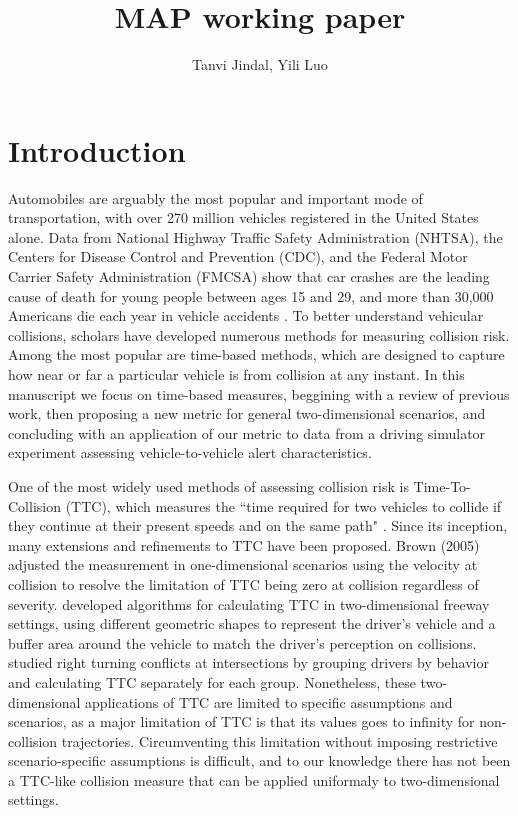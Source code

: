 \documentclass{article}
\title{MAP working paper}
\author{Tanvi Jindal, Yili Luo }
\date{}
\begin{document}
\maketitle

\section{Introduction}
Automobiles are arguably the most popular and important mode of transportation, with over 270 million vehicles registered in the United States alone.  Data from National Highway Traffic Safety Administration (NHTSA), the Centers for Disease Control and Prevention (CDC), and the Federal Motor Carrier Safety Administration (FMCSA) show that car crashes are the leading cause of death for young people between ages 15 and 29, and more than 30,000 Americans die each year in vehicle accidents \citep{Beltz2018}. To better understand vehicular collisions, scholars have developed numerous methods for measuring collision risk. Among the most popular are time-based methods, which are designed to capture how near or far a particular vehicle is from collision at any instant.  In this manuscript we focus on time-based measures, beggining with a review of previous work, then proposing a new metric for general two-dimensional scenarios, and concluding with an application of our metric to data from a driving simulator experiment assessing vehicle-to-vehicle alert characteristics. 

One of the most widely used methods of assessing collision risk is Time-To-Collision (TTC), which measures the ``time required for two vehicles to collide if they continue at their present speeds and on the same path" \citep{Hayward}. Since its inception, many extensions and refinements to TTC have been proposed.  Brown (2005) adjusted the measurement in one-dimensional scenarios using the velocity at collision to resolve the limitation of TTC being zero at collision regardless of severity.  \citet{Huo} developed algorithms for calculating TTC in two-dimensional freeway settings, using different geometric shapes to represent the driver's vehicle and a buffer area around the vehicle to match the driver's perception on collisions. \cite{Sobhani} studied right turning conflicts at intersections by grouping drivers by behavior and calculating TTC separately for each group. Nonetheless, these two-dimensional applications of TTC are limited to specific assumptions and scenarios, as a major limitation of TTC is that its values goes to infinity for non-collision trajectories.  Circumventing this limitation without imposing restrictive scenario-specific assumptions is difficult, and to our knowledge there has not been a TTC-like collision measure that can be applied uniformaly to two-dimensional settings.
\end{document}

